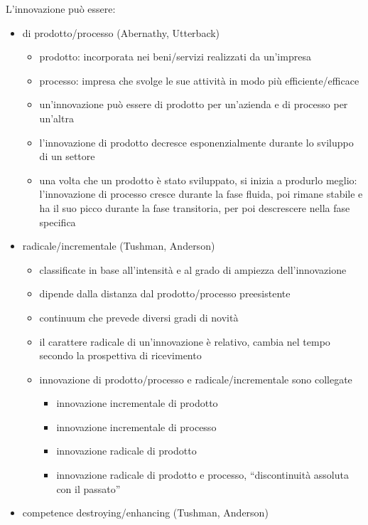\documentclass[answers, a4paper, 11pt]{exam}
\begin{document}
L'innovazione può essere:
\begin{itemize}
    \item di prodotto/processo (Abernathy, Utterback)
    \begin{itemize}
        \item prodotto: incorporata nei beni/servizi realizzati da un'impresa
        \item processo: impresa che svolge le sue attività in modo più efficiente/efficace
        \item un'innovazione può essere di prodotto per un'azienda e di processo per un'altra
        \item l'innovazione di prodotto decresce esponenzialmente durante lo sviluppo di un settore
        \item una volta che un prodotto è stato sviluppato, si inizia a produrlo meglio: l'innovazione di processo cresce durante la fase fluida, poi rimane stabile e ha il suo picco durante la fase transitoria, per poi descrescere nella fase specifica
    \end{itemize}
    \item radicale/incrementale (Tushman, Anderson)
    \begin{itemize}
        \item classificate in base all'intensità e al grado di ampiezza dell'innovazione
        \item dipende dalla distanza dal prodotto/processo preesistente
        \item continuum che prevede diversi gradi di novità
        \item il carattere radicale di un'innovazione è relativo, cambia nel tempo secondo la prospettiva di ricevimento
        \item innovazione di prodotto/processo e radicale/incrementale sono collegate
        \begin{itemize}
            \item innovazione incrementale di prodotto
            \item innovazione incrementale di processo
            \item innovazione radicale di prodotto
            \item innovazione radicale di prodotto e processo, ``discontinuità assoluta con il passato'' 
        \end{itemize}
    \end{itemize}
    \item competence destroying/enhancing (Tushman, Anderson)

\end{itemize}
\end{document}
